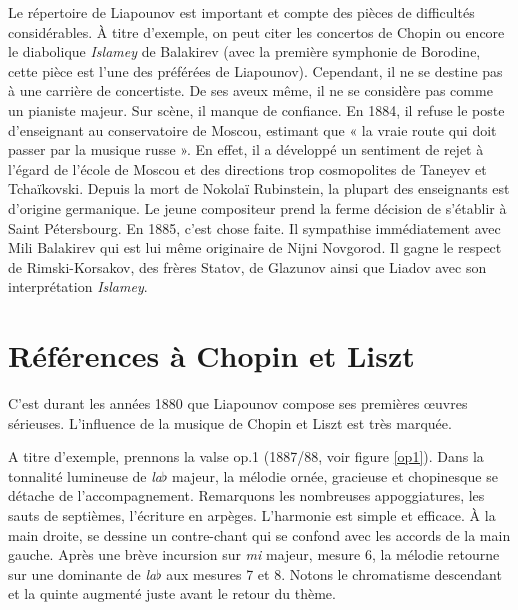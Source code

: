 \noindent Le répertoire de Liapounov est important et compte des pièces de difficultés considérables. À titre d'exemple, on peut citer les concertos de Chopin ou encore le diabolique \emph{Islamey} de Balakirev (avec la première symphonie de Borodine, cette pièce est l'une des préférées de Liapounov). Cependant, il ne se destine pas à une carrière de concertiste. De ses aveux même, il ne se considère pas comme un pianiste majeur. Sur scène, il manque de confiance. En 1884, il refuse le poste d'enseignant au conservatoire de Moscou, estimant que « la vraie route qui doit passer par la musique russe ». En effet, il a développé un sentiment de rejet à l'égard de l'école de Moscou et des directions trop cosmopolites de Taneyev et Tchaïkovski. Depuis la mort de Nokolaï Rubinstein, la plupart des enseignants est d'origine germanique. Le jeune compositeur prend la ferme décision de s'établir à Saint Pétersbourg. En 1885, c'est chose faite. Il sympathise immédiatement avec Mili Balakirev qui est lui même originaire de Nijni Novgorod. Il gagne le respect de Rimski-Korsakov, des frères Statov, de Glazunov ainsi que Liadov avec son interprétation \emph{Islamey}.

\section{Références à Chopin et Liszt}

C'est durant les années 1880 que Liapounov compose ses premières œuvres sérieuses. L'influence de la musique de Chopin et Liszt est très marquée.

A titre d'exemple, prennons la valse op.1 (1887/88, voir figure \ref{op1}). Dans la tonnalité lumineuse de \emph{la}$\flat$ majeur, la mélodie ornée, gracieuse et chopinesque se détache de l'accompagnement. Remarquons les nombreuses appoggiatures, les sauts de septièmes, l'écriture en arpèges. L'harmonie est simple et efficace. À la main droite, se dessine un contre-chant qui se confond avec les accords de la main gauche. Après une brève incursion sur \emph{mi} majeur, mesure 6, la mélodie retourne sur une dominante de \emph{la}$\flat$ aux mesures 7 et 8. Notons le chromatisme descendant et la quinte augmenté juste avant le retour du thème.

